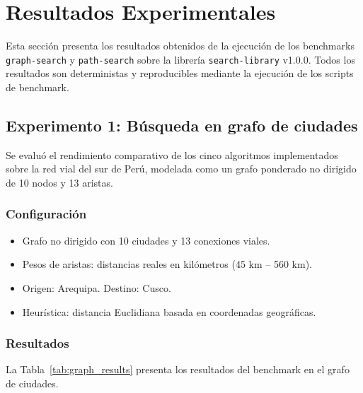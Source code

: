\section{Resultados Experimentales}

Esta sección presenta los resultados obtenidos de la ejecución de los benchmarks \texttt{graph-search} y \texttt{path-search} sobre la librería \texttt{search-library} v1.0.0. Todos los resultados son deterministas y reproducibles mediante la ejecución de los scripts de benchmark.

\subsection{Experimento 1: Búsqueda en grafo de ciudades}

Se evaluó el rendimiento comparativo de los cinco algoritmos implementados sobre la red vial del sur de Perú, modelada como un grafo ponderado no dirigido de 10 nodos y 13 aristas.

\subsubsection{Configuración}

\begin{itemize}
    \item Grafo no dirigido con 10 ciudades y 13 conexiones viales.
    \item Pesos de aristas: distancias reales en kilómetros (45 km -- 560 km).
    \item Origen: Arequipa. Destino: Cusco.
    \item Heurística: distancia Euclidiana basada en coordenadas geográficas.
\end{itemize}

\subsubsection{Resultados}

La Tabla~\ref{tab:graph_results} presenta los resultados del benchmark en el grafo de ciudades.


